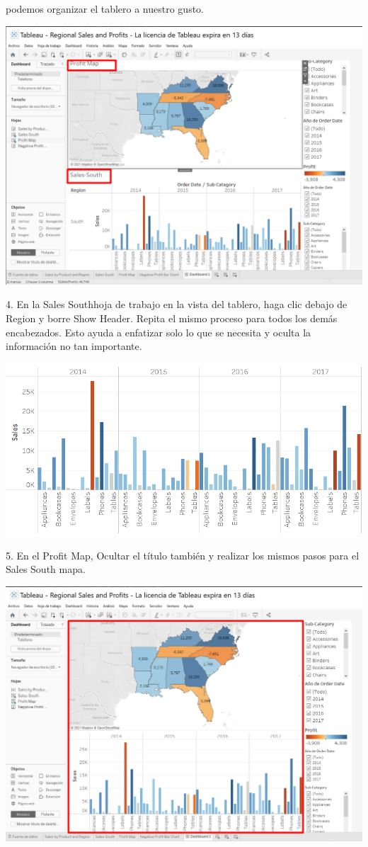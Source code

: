 \documentclass[12pt,letterpaper]{article}
\begin{document}
podemos organizar el tablero a nuestro gusto.
\begin{center}
    \includegraphics[width=16cm]{img/48.png}  
\end{center}
4. En la Sales Southhoja de trabajo en la vista del tablero, haga clic debajo de Region y
borre Show Header. Repita el mismo proceso para todos los demás encabezados. Esto ayuda a
enfatizar solo lo que se necesita y oculta la información no tan importante.
\begin{center}
    \includegraphics[width=16cm]{img/49.png}  
\end{center}
5. En el Profit Map, Ocultar el título también y realizar los mismos pasos para el Sales
South mapa.
\begin{center}
    \includegraphics[width=16cm]{img/50.png}  
\end{center}
\end{document}
